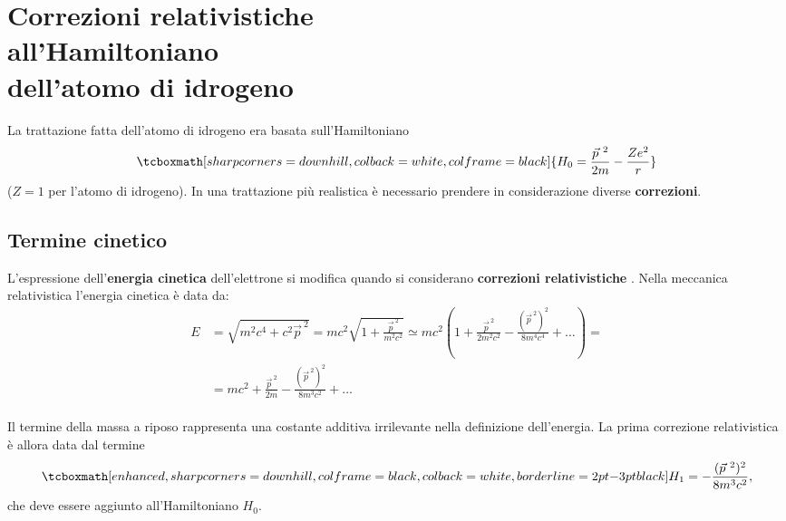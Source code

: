 \chapter[Correzioni relativistiche all'atomo di idrogeno]{Correzioni relativistiche\\ all'Hamiltoniano\\ dell'atomo di idrogeno}

La trattazione fatta dell'atomo di idrogeno era basata sull'Hamiltoniano
	\begin{equation}
	\label{eq:cap25_1}
		\tcboxmath[sharp corners=downhill, colback=white, colframe=black]{
			H_0=\frac{\vec{p}^{\ 2}}{2m}-\frac{Z e^2}{r}
			}
\end{equation}
($Z=1$ per l'atomo di idrogeno). In una trattazione più realistica è necessario prendere in considerazione diverse \textbf{correzioni}.

\section{Termine cinetico}

L'espressione dell'\textbf{energia cinetica} dell'elettrone si modifica quando si considerano \textbf{correzioni relativistiche }. Nella meccanica relativistica l'energia cinetica è data da:
	\begin{align} 
		E & =  \sqrt{m^2c^4+c^2\vec{p}^{\ 2}}= mc^2 \sqrt{1+ \frac{\vec{p}^{\ 2}}{m^2c^2}} \simeq  mc^2 \left( 1+ \frac{\vec{p}^{\ 2}}{2m^2c^2}-\frac{(\vec{p}^{\ 2})^2}{8m^4c^4}+\dots \right) = \nonumber  \\
		& =  mc^2+\frac{\vec{p}^{\ 2}}{2m}-\frac{(\vec{p}^{\ 2})^2}{8m^3c^2}+ \dots 
	\end{align}\\
	
Il termine della massa a riposo rappresenta una costante additiva irrilevante nella definizione dell'energia. La prima correzione relativistica è allora data dal termine 
	\begin{equation}
	\label{eq:cap25_2}
		\tcboxmath[enhanced, sharp corners=downhill, colframe=black, colback=white, borderline={2pt}{-3pt}{black}]{
			H_1=-\frac{(\vec{p}^{\ 2})^2}{8m^3c^2} ,
			}
	\end{equation}
che deve essere aggiunto all'Hamiltoniano $H_0$. \\

